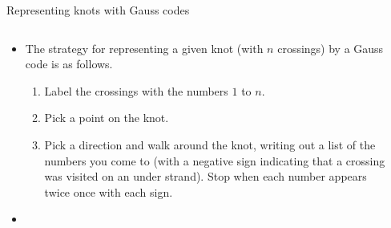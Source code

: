 \documentclass{beamer}
\begin{document}
\begin{frame}{Representing knots with Gauss codes}
    \begin{columns}
        \begin{column}{0.65\textwidth}
            \begin{itemize}
            \item The strategy for representing a given knot (with $n$ crossings) by a Gauss code is as follows.
            \begin{enumerate}
                    \item Label the crossings with the numbers $1$ to $n$.
                    \item Pick a point on the knot.
                    \item Pick a direction and walk around the knot, writing out a list of the numbers you come to (with a negative sign indicating that a crossing was visited on an under strand). Stop when each number appears twice once with each sign.
            \end{enumerate}
        \item[]{    
	            \only<8>{{\color{white}, $4$}}
	            \only<9->{, $4$}
	            \only<8-9>{{\color{white}, ${-3}$}}
	            \only<10->{, ${-3}$}
	            \only<8-10>{{\color{white}, $1$}}
	            \only<11->{, $1$}
	            \only<8-11>{{\color{white}, ${-2}$}}
	            \only<12->{, ${-2}$}
	            \only<8-12>{{\color{white}, $3$}}
	            \only<13->{, $3$}
	            \only<8-13>{{\color{white}, ${-4}$}}
	            \only<14->{, ${-4}$}
	            \only<8-14>{{\color{white}, $2$}}
	            \only<15->{, $2$}
	        }
        \end{itemize}
        \end{column}
        \begin{column}{0.25\textwidth}
\end{column}
\end{columns}
\end{frame}
\end{document}
